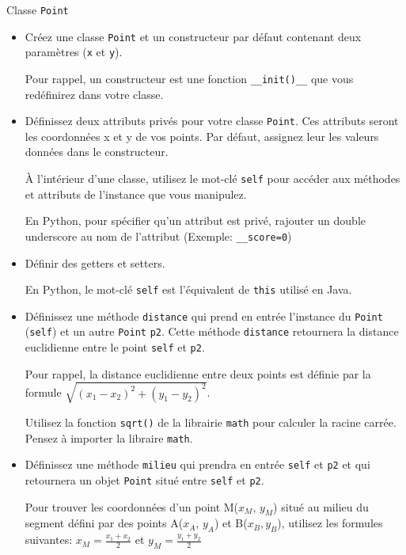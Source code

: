 \begin{Exercice}[15 minutes] Classe \lstinline{Point}
    \begin{itemize}
        \item Créez une classe \lstinline{Point} et un constructeur par défaut contenant deux paramètres (\lstinline{x} et \lstinline{y}).
        \begin{conseil}
            Pour rappel, un constructeur est une fonction \lstinline{__init()__} que vous redéfinirez dans votre classe.
        \end{conseil}
        \item Définissez deux attributs privés pour votre classe \lstinline{Point}. Ces attributs seront les coordonnées x et y de vos points. Par défaut, assignez leur les valeurs données dans le constructeur.
        \begin{conseil}
            À l'intérieur d'une classe, utilisez le mot-clé \lstinline{self} pour accéder aux méthodes et attributs de l'instance que vous manipulez.

            En Python, pour spécifier qu'un attribut est privé, rajouter un double underscore au nom de l'attribut (Exemple: \lstinline{__score=0})
        \end{conseil}
        \item Définir des getters et setters.
        \begin{conseil}
            En Python, le mot-clé \lstinline{self} est l'équivalent de \lstinline{this} utilisé en Java.
        \end{conseil}
        \item Définissez une méthode \lstinline{distance} qui prend en entrée l'instance du \lstinline{Point} (\lstinline{self}) et un autre \lstinline{Point} \lstinline{p2}. Cette méthode \lstinline{distance} retournera la distance euclidienne entre le point \lstinline{self} et \lstinline{p2}. 
        \begin{conseil}
            Pour rappel, la distance euclidienne entre deux points est définie par la formule $\sqrt{(x_1 - x_2)^2 + (y_1 - y_2)^2}$.

            Utilisez la fonction \lstinline{sqrt()} de la librairie \lstinline{math} pour calculer la racine carrée. Pensez à importer la libraire \lstinline{math}.
        \end{conseil}
        \item Définissez une méthode \lstinline{milieu} qui prendra en entrée \lstinline{self} et \lstinline{p2} et qui retournera un objet \lstinline{Point} situé entre \lstinline{self} et \lstinline{p2}.
        \begin{conseil}
            Pour trouver les coordonnées d'un point M($x_M$, $y_M$) situé au milieu du segment défini par des points A($x_A$, $y_A$) et B($x_B, y_B$),
            utilisez les formules suivantes:
            $x_M = \frac{x_1 + x_2}{2}$ et $y_M = \frac{y_1 + y_2}{2}$
        \end{conseil}


\end{itemize}
\end{Exercice}
